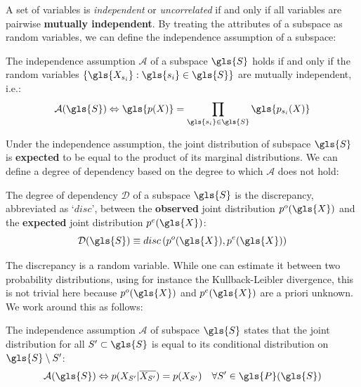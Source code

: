 A set of variables is \textit{independent} or \textit{uncorrelated} if and only if all variables are pairwise \textbf{mutually independent}. 
By treating the attributes of a subspace as random variables, we can define the independence assumption of a subspace: 
\begin{definition}
	\label{IA1}
	The independence assumption $\mathcal{A}$ of a subspace $\gls{S}$  holds if and only if the random variables $\{ \gls{X_{s_i}} : \gls{s_i} \in \gls{S} \}$ are mutually independent, i.e.:
	\begin{equation}
	\mathcal{A}(\gls{S}) \Leftrightarrow \gls{p(X)} = \prod_{\gls{s_i} \in \gls{S}} \gls{p_{s_{i}}(X)} \label{eq:IA1}
	\end{equation}
\end{definition}
Under the independence assumption, the joint distribution of subspace $\gls{S}$ is \textbf{expected} to be equal to the product of its marginal distributions. We can define a degree of dependency %
based on the degree to which $\mathcal{A}$ does not hold: 
\begin{definition}
	\label{DependencyDegree}
	The degree of dependency $\mathcal{D}$ of a subspace $\gls{S}$ is the discrepancy, abbreviated as `$disc$', between the \textbf{observed} joint distribution $p^{o}(\gls{X})$ and the \textbf{expected} joint distribution $p^{e}(\gls{X})$: 
	\begin{equation}
	\mathcal{D}(\gls{S}) \equiv disc \left(p^{o}(\gls{X}),p^{e}(\gls{X})\right) 
	\end{equation}
\end{definition} 
The discrepancy is a random variable. 
While one can estimate it between two probability distributions, using for instance the Kullback-Leibler divergence, %
 this is not trivial here because $p^o(\gls{X})$ and $p^{e}(\gls{X})$ are a priori unknown. We work around this as follows: 
\begin{lemma}
	\label{lemma1}
	The independence assumption $\mathcal{A}$ of subspace $\gls{S}$ states that the joint distribution for all  $S' \subset \gls{S}$  is equal to its conditional distribution on $\gls{S} \setminus S'$:
	\begin{equation}
	\mathcal{A}(\gls{S}) \Leftrightarrow p(X_{S'}|\overline{X_{S'}}) =  p(X_{S'}) \quad \forall S' \in \gls{P}(\gls{S})
	\end{equation}
\end{lemma} 
